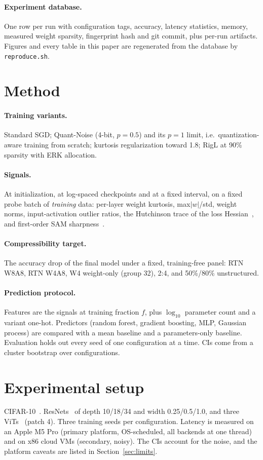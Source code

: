 \documentclass[10pt]{article}
\begin{document}
\paragraph{Experiment database.} One row per run with configuration tags, accuracy, latency
statistics, memory, measured weight sparsity, fingerprint hash and git commit, plus per-run
artifacts. Figures and every table in this paper are regenerated from the database by
\texttt{reproduce.sh}.

\section{Method}
\paragraph{Training variants.} Standard SGD; Quant-Noise (4-bit, $p{=}0.5$) and its $p{=}1$
limit, i.e.\ quantization-aware training from scratch; kurtosis regularization toward 1.8; RigL at
90\% sparsity with ERK allocation.
\paragraph{Signals.} At initialization, at log-spaced checkpoints and at a fixed interval, on
a fixed probe batch of \emph{training} data: per-layer weight kurtosis, max$|w|$/std, weight
norms, input-activation outlier ratios, the Hutchinson trace of the loss
Hessian~\citep{hutchinson1989}, and first-order SAM sharpness~\citep{foret2021sam}.
\paragraph{Compressibility target.} The accuracy drop of the final model under a fixed,
training-free panel: RTN W8A8, RTN W4A8, W4 weight-only (group 32), 2:4, and 50\%/80\%
unstructured.
\paragraph{Prediction protocol.} Features are the signals at training fraction $f$, plus
$\log_{10}$ parameter count and a variant one-hot. Predictors (random forest, gradient
boosting, MLP, Gaussian process) are compared with a mean baseline and a parameters-only
baseline. Evaluation holds out every seed of one configuration at a time. CIs come from a
cluster bootstrap over configurations.

\section{Experimental setup}
CIFAR-10~\citep{krizhevsky2009cifar}. ResNets~\citep{he2016resnet} of depth 10/18/34 and width
0.25/0.5/1.0, and three ViTs~\citep{dosovitskiy2021vit} (patch 4). Three training seeds per
configuration. Latency is measured on an Apple M5 Pro (primary platform, OS-scheduled, all
backends at one thread) and on x86 cloud VMs (secondary, noisy). The CIs account for the
noise, and the platform caveats are listed in Section~\ref{sec:limits}.
\end{document}
